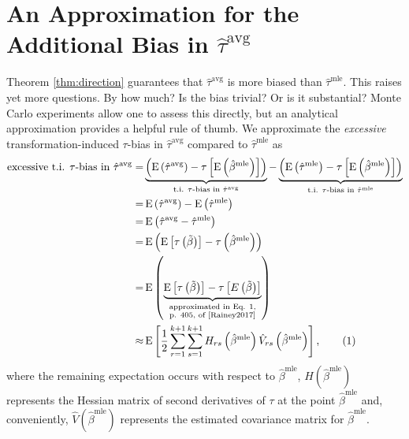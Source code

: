 \documentclass[11pt]{article}
\newcommand\numberthis{\addtocounter{equation}{1}\tag{\theequation}}
\DeclareMathOperator*{\E}{\text{E}}
\begin{document}
\section*{An Approximation for the Additional Bias in $\hat{\tau}^\text{avg}$}

Theorem \ref{thm:direction} guarantees that $\hat{\tau}^\text{avg}$ is more biased than $\hat{\tau}^\text{mle}$.
This raises yet more questions.
By how much? Is the bias trivial? Or is it substantial? Monte Carlo experiments allow one to assess this directly, but an analytical approximation provides a helpful rule of thumb.
We approximate the \textit{excessive} transformation-induced $\tau$-bias in $\hat{\tau}^\text{avg}$ compared to $\hat{\tau}^\text{mle}$ as
\begin{align*}
\text{excessive t.i. $\tau$-bias in } \hat{\tau}^\text{avg} =& \underbrace{\left( \E \left( \hat{\tau}^\text{avg}\right) - \tau \left[\E \left( \hat{\beta}^\text{mle} \right) \right] \right) }_{\text{t.i. } \tau\text{-bias in }\hat{\tau}^{\text{avg}}} - \underbrace{ \left( \E \left( \hat{\tau}^\text{mle}\right) -  \tau \left[\E \left( \hat{\beta}^\text{mle} \right) \right] \right)}_{\text{t.i. } \tau\text{-bias in }\hat{\tau}^{\text{mle}}}\\
=& \E \left( \hat{\tau}^\text{avg}\right) - \E \left( \hat{\tau}^\text{mle}\right)\\
=& \E \left( \hat{\tau}^\text{avg} - \hat{\tau}^\text{mle} \right)\\
=& \E \left(     \E \left[ \tau\left( \tilde{\beta} \right) \right]      -      \tau \left( \hat{\beta}^\text{mle} \right)     \right)\\
=& \E \left(     \underbrace{\E \left[ \tau\left( \tilde{\beta} \right) \right]      -      \tau \left[ E\left(  \tilde{\beta} \right)\right]}_{\substack{\text{approximated in Eq. 1,} \\ \text{p. 405, of \cite{Rainey2017}}}}   \right)\\
\approx & \E \left[ \dfrac{1}{2} \displaystyle \sum_{r = 1}^{k+1} \sum_{s = 1}^{k+1} H_{rs}\left( \hat{\beta}^\text{mle} \right) \hat{V}_{rs} \left( \hat{\beta}^{\text{mle}} \right) \right], \numberthis \label{eqn:avg-approx}
\end{align*}
where the remaining expectation occurs with respect to $\hat{\beta}^\text{mle}$, $H\left( \hat{\beta}^\text{mle} \right)$ represents the Hessian matrix of second derivatives of $\tau$ at the point $\hat{\beta}^\text{mle}$ and, conveniently, $\hat{V} \left( \hat{\beta}^{\text{mle}} \right)$ represents the estimated covariance matrix for $\hat{\beta}^\text{mle}$.
\end{document}
